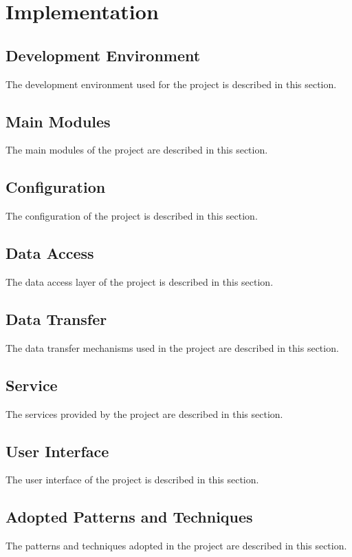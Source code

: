 \chapter{Implementation}\label{ch:implementation}


\section{Development Environment}\label{sec:development-environment}

The development environment used for the project is described in this section.

\section{Main Modules}\label{sec:main-modules}

The main modules of the project are described in this section.

\section{Configuration}\label{sec:configuration}

The configuration of the project is described in this section.

\section{Data Access}\label{sec:data-access}

The data access layer of the project is described in this section.

\section{Data Transfer}\label{sec:data-transfer}

The data transfer mechanisms used in the project are described in this section.

\section{Service}\label{sec:service}

The services provided by the project are described in this section.

\section{User Interface}\label{sec:user-interface}

The user interface of the project is described in this section.

\section{Adopted Patterns and Techniques}\label{sec:adopted-patterns-and-techniques}

The patterns and techniques adopted in the project are described in this section.
